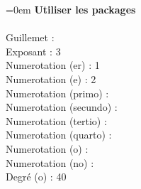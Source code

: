 \documentclass{article}
\begin{document}
\parindent=0em
\textbf{Utiliser les packages} \\ \\
Guillemet : \fg \\
Exposant : 3 \\
Numerotation (er) : 1\ier \\
Numerotation (e) : 2\ieme \\
Numerotation (primo) : \primo \\
Numerotation (secundo) : \secundo \\
Numerotation (tertio) : \tertio \\
Numerotation (quarto) : \quarto \\
Numerotation (o) :  \\
Numerotation (no) : \no \\
Degré (o) : 40\degres \\
\end{document}
